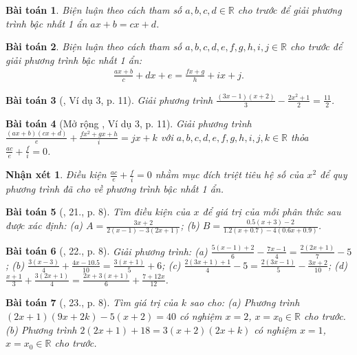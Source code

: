 \documentclass{article}
\newtheorem{baitoan}{Bài toán}
\newtheorem{nhanxet}{Nhận xét}
\begin{document}
\begin{baitoan}
	Biện luận theo cách tham số $a,b,c,d\in\mathbb{R}$ cho trước để giải phương trình bậc nhất 1 ẩn $ax + b = cx + d$.
\end{baitoan}

\begin{baitoan}
	Biện luận theo cách tham số $a,b,c,d,e,f,g,h,i,j\in\mathbb{R}$ cho trước để giải phương trình bậc nhất 1 ẩn:
	\begin{align*}
		\frac{ax + b}{c} + dx + e = \frac{fx + g}{h} + ix + j.
	\end{align*}
\end{baitoan}

\begin{baitoan}[\cite{SGK_Toan_8_tap_2}, Ví dụ 3, p. 11]
	Giải phương trình $\frac{(3x - 1)(x + 2)}{3} - \frac{2x^2 + 1}{2} = \frac{11}{2}$.
\end{baitoan}

\begin{baitoan}[Mở rộng \cite{SGK_Toan_8_tap_2}, Ví dụ 3, p. 11]
	Giải phương trình $\frac{(ax + b)(cx + d)}{e} + \frac{fx^2 + gx + h}{i} = jx + k$ với $a,b,c,d,e,f,g,h,i,j,k\in\mathbb{R}$ thỏa $\frac{ac}{e} + \frac{f}{i} = 0$.
\end{baitoan}

\begin{nhanxet}
	Điều kiện $\frac{ac}{e} + \frac{f}{i} = 0$ nhằm mục đích triệt tiêu hệ số của $x^2$ để quy phương trình đã cho về phương trình bậc nhất 1 ẩn.
\end{nhanxet}

\begin{baitoan}[\cite{SBT_Toan_8_tap_2}, 21., p. 8]
	Tìm điều kiện của $x$ để giá trị của mỗi phân thức sau được xác định: (a) $A = \frac{3x + 2}{2(x - 1) - 3(2x + 1)}$; (b) $B = \frac{0.5(x + 3) - 2}{1.2(x + 0.7) - 4(0.6x + 0.9)}$.
\end{baitoan}

\begin{baitoan}[\cite{SBT_Toan_8_tap_2}, 22., p. 8]
	Giải phương trình: (a) $\frac{5(x - 1) + 2}{6} - \frac{7x - 1}{4} = \frac{2(2x + 1)}{7} - 5$; (b) $\frac{3(x - 3)}{4} + \frac{4x - 10.5}{10} = \frac{3(x + 1)}{5} + 6$; (c) $\frac{2(3x + 1) + 1}{4} - 5 = \frac{2(3x - 1)}{5} - \frac{3x + 2}{10}$; (d) $\frac{x + 1}{3} + \frac{3(2x + 1)}{4} = \frac{2x + 3(x + 1)}{6} + \frac{7 + 12x}{12}$.
\end{baitoan}

\begin{baitoan}[\cite{SBT_Toan_8_tap_2}, 23., p. 8]
	Tìm giá trị của $k$ sao cho: (a) Phương trình $(2x + 1)(9x + 2k) - 5(x + 2) = 40$ có nghiệm $x = 2$, $x = x_0\in\mathbb{R}$ cho trước. (b) Phương trình $2(2x + 1) + 18 = 3(x + 2)(2x + k)$ có nghiệm $x = 1$, $x = x_0\in\mathbb{R}$ cho trước.
\end{baitoan}
\end{document}
